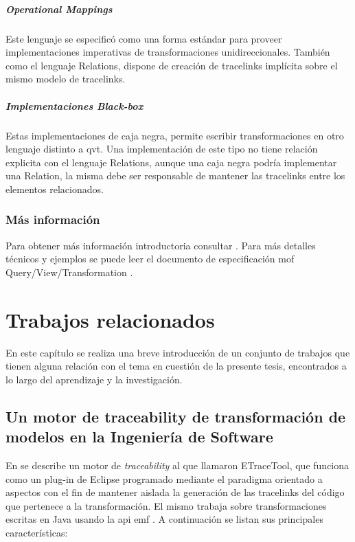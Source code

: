 \documentclass[a4paper,12pt,oneside,spanish]{book}
\begin{document}
\paragraph{Operational Mappings}

Este lenguaje se especificó como una forma estándar para proveer implementaciones imperativas de transformaciones unidireccionales. También como el lenguaje Relations, dispone de creación de tracelinks implícita sobre el mismo modelo de tracelinks.


\paragraph{Implementaciones Black-box}

Estas implementaciones de caja negra, permite escribir transformaciones en otro lenguaje distinto a \gls{qvt}. Una implementación de este tipo no tiene
relación explicita con el lenguaje Relations, aunque una caja negra podría implementar una Relation, la misma debe ser responsable de mantener las tracelinks entre los elementos relacionados.


\subsection{Más información}

Para obtener más información introductoria consultar \cite{DSDPM}. Para más detalles técnicos y ejemplos se puede leer el documento de especificación \gls{mof} Query/View/Transformation \cite{QVT}.




\chapter{Trabajos relacionados}

En este capítulo se realiza una breve introducción de un conjunto de trabajos que tienen alguna relación con el tema en cuestión de la presente tesis, encontrados a lo largo del aprendizaje y la investigación.

\section{Un motor de traceability de transformación de modelos en la Ingeniería de Software}

En \cite{AmarLeblancCoulette} se describe un motor de \textit{traceability} al que llamaron ETraceTool, que funciona como un plug-in de Eclipse programado mediante el paradigma orientado a aspectos con el fin de mantener aislada la generación de las tracelinks del código que pertenece a la transformación. El mismo trabaja sobre transformaciones escritas en Java usando la \gls{api} \gls{emf} \cite{EMF}. A continuación se listan sus principales características:
\end{document}
